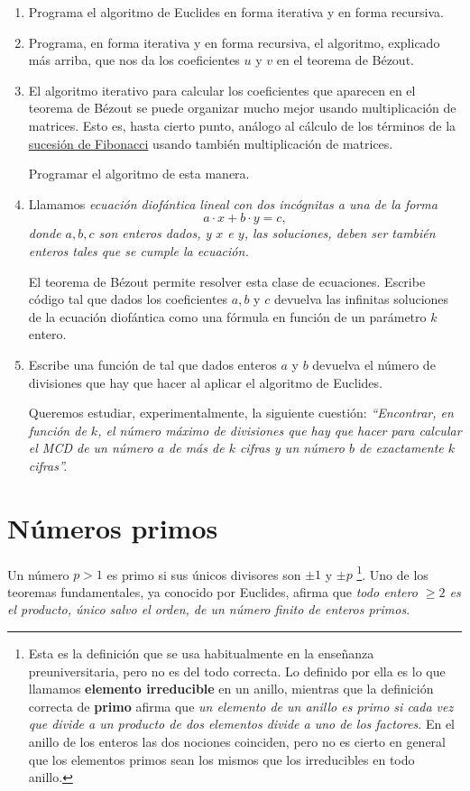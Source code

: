 \begin{ejer}
\begin{enumerate}
 \item Programa el algoritmo de Euclides en forma iterativa y en forma
recursiva. 
 \item Programa, en forma iterativa y en forma recursiva, el algoritmo,
explicado m\'as arriba,  que nos
da los coeficientes $u$ y $v$ en el teorema de Bézout.
\item El algoritmo iterativo para calcular los coeficientes que aparecen en el
teorema de Bézout se puede organizar mucho mejor usando multiplicaci\'on de
matrices. Esto es, hasta cierto punto, an\'alogo al c\'alculo de los t\'erminos
de la \hyperref[fib-matrices]{sucesi\'on de Fibonacci} usando tambi\'en
multiplicaci\'on de matrices. 

Programar el algoritmo de esta manera.


\item Llamamos {\itshape ecuaci\'on diof\'antica lineal con dos inc\'ognitas a
una de la forma 
\[a\cdot x+b\cdot y=c,\]
\noindent donde $a,b,c$ son enteros dados,  y $x$ e $y$, las soluciones, deben
ser tambi\'en enteros tales que se cumple la ecuaci\'on. }

El teorema de Bézout permite resolver esta clase de ecuaciones. Escribe c\'odigo
tal que dados los coeficientes $a,b$ y $c$ devuelva las infinitas soluciones de
la ecuaci\'on diof\'antica como una f\'ormula en funci\'on de un par\'ametro $k$
entero.

\item Escribe una funci\'on de {\sage} tal que dados enteros $a$ y $b$ devuelva
el n\'umero de divisiones que hay que hacer al aplicar el algoritmo de
Euclides. 

Queremos estudiar, experimentalmente,  la siguiente cuesti\'on: {\itshape
``Encontrar, en funci\'on
de $k$, el n\'umero m\'aximo de divisiones que hay que hacer para calcular el
MCD de un n\'umero $a$ de m\'as de $k$ cifras y un n\'umero $b$ de exactamente
$k$ cifras''.} 
\end{enumerate}
\end{ejer}


\section{N\'umeros primos}\label{primos}

Un n\'umero $p>1$ es primo si sus \'unicos divisores son $\pm 1$ y $\pm p$
\footnote{Esta es la definici\'on que se usa habitualmente en la ense\~nanza preuniversitaria, pero no es del todo correcta. Lo definido por ella es lo que llamamos {\bf elemento irreducible} en un anillo, mientras que la definici\'on correcta de {\bf primo} afirma que {\itshape un elemento de un anillo es primo si cada vez que divide a un producto de dos elementos divide a uno de los factores}. En el anillo de los enteros las dos nociones coinciden, pero no es cierto en general que los elementos primos sean los mismos que los irreducibles en todo anillo.}. Uno
de los teoremas fundamentales, ya conocido por Euclides, afirma que {\itshape
todo entero $\ge 2$ es el producto, \'unico salvo el orden, de un n\'umero
finito de enteros primos}.

